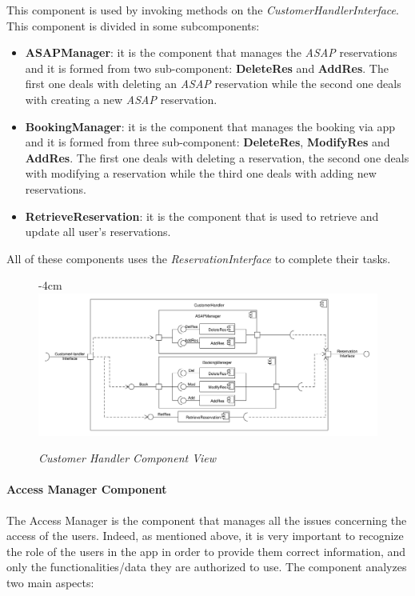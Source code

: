 \documentclass{article}
\begin{document}
					This component is used by invoking methods on the \emph{CustomerHandlerInterface}. This component is divided in some subcomponents:
					
					\begin{itemize}
						\item {\bfseries ASAPManager}: it is the component that manages the \emph{ASAP} reservations and it is formed from two sub-component: {\bfseries DeleteRes} and {\bfseries AddRes}. The first one deals with deleting an \emph{ASAP} reservation while the second one deals with creating a new \emph{ASAP} reservation.
						
						\item {\bfseries BookingManager}: it is the component that manages the booking via app and it is formed from three sub-component: {\bfseries DeleteRes}, {\bfseries ModifyRes} and {\bfseries AddRes}. The first one deals with deleting a reservation, the second one deals with modifying a reservation while the third one deals with adding new reservations. 
						
						\item {\bfseries RetrieveReservation}: it is the component that is used to retrieve and update all user’s reservations.
					\end{itemize}
				
					All of these components uses the \emph{ReservationInterface} to complete their tasks.
					\bigskip
					\begin{figure}[h]
						\begin{adjustwidth} {-4cm}{}
							\centering
							\includegraphics[scale=0.45]{Component Diagrams/CustomerHandlerComponentView.pdf}\\
						\end{adjustwidth}
						\caption{\emph{Customer Handler Component View}}
					\end{figure}
				\newpage
				\paragraph{Access Manager Component}
					The Access Manager is the component that manages all the issues concerning the access of the users. Indeed, as mentioned above, it is very important to recognize the role of the users in the app in order to provide them correct information, and only the functionalities/data they are authorized to use. The component analyzes two main aspects:
					
\end{document}
